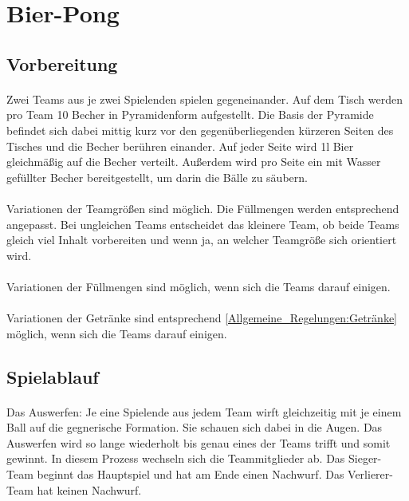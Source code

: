 \section{Bier-Pong}
\subsection{Vorbereitung}
\paragraph{}
Zwei Teams aus je zwei Spielenden spielen gegeneinander.
Auf dem Tisch werden pro Team 10 Becher in Pyramidenform aufgestellt.
Die Basis der Pyramide befindet sich dabei mittig kurz vor den gegenüberliegenden kürzeren Seiten des Tisches und die Becher berühren einander.
Auf jeder Seite wird 1l Bier gleichmäßig auf die Becher verteilt.
Außerdem wird pro Seite ein mit Wasser gefüllter Becher bereitgestellt, um darin die Bälle zu säubern.

\paragraph{}
Variationen der Teamgrößen sind möglich.
Die Füllmengen werden entsprechend angepasst.
Bei ungleichen Teams entscheidet das kleinere Team, ob beide Teams gleich viel Inhalt vorbereiten und wenn ja, an welcher Teamgröße sich orientiert wird.

\paragraph{}
Variationen der Füllmengen sind möglich, wenn sich die Teams darauf einigen.

\paragraph{}
Variationen der Getränke sind entsprechend \ref{Allgemeine_Regelungen:Getränke} möglich, wenn sich die Teams darauf einigen.

\subsection{Spielablauf} \label{Bier-Pong:Spielablauf}
\paragraph{}
Das Auswerfen: Je eine Spielende aus jedem Team wirft gleichzeitig mit je einem Ball auf die gegnerische Formation.
Sie schauen sich dabei in die Augen. Das Auswerfen wird so lange wiederholt bis genau eines der Teams trifft und somit gewinnt.
In diesem Prozess wechseln sich die Teammitglieder ab.
Das Sieger-Team beginnt das Hauptspiel und hat am Ende einen Nachwurf.
Das Verlierer-Team hat keinen Nachwurf.

